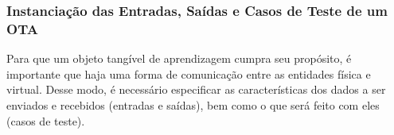 





\subsubsection{Instanciação das Entradas, Saídas e Casos de Teste de um OTA}\label{subsubsec:casosdetesteOFVA}

Para que um objeto tangível de aprendizagem cumpra seu propósito, é importante que haja uma forma de comunicação entre as entidades física e virtual. Desse modo, é necessário especificar as características dos dados a ser enviados e recebidos (entradas e saídas), bem como o que será feito com eles (casos de teste).

